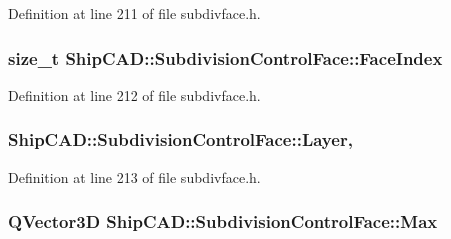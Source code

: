 Definition at line 211 of file subdivface.\-h.

\hypertarget{classShipCAD_1_1SubdivisionControlFace_a003c8c3987b10f6f2217a95ef97ba47d}{
\subsubsection[{Face\-Index}]{\setlength{\rightskip}{0pt plus 5cm}size\-\_\-t Ship\-C\-A\-D\-::\-Subdivision\-Control\-Face\-::\-Face\-Index\hspace{0.3cm}{\ttfamily [read]}}}\label{classShipCAD_1_1SubdivisionControlFace_a003c8c3987b10f6f2217a95ef97ba47d}


Definition at line 212 of file subdivface.\-h.

\hypertarget{classShipCAD_1_1SubdivisionControlFace_af4197bb400705aaea045fbe02921b3ea}{
\subsubsection[{Layer}]{ Ship\-C\-A\-D\-::\-Subdivision\-Control\-Face\-::\-Layer\hspace{0.3cm}{\ttfamily [read]}, {\ttfamily [write]}}}\label{classShipCAD_1_1SubdivisionControlFace_af4197bb400705aaea045fbe02921b3ea}


Definition at line 213 of file subdivface.\-h.

\hypertarget{classShipCAD_1_1SubdivisionControlFace_a256f4b52aa41d3140502ce70f98b1fe1}{
\subsubsection[{Max}]{\setlength{\rightskip}{0pt plus 5cm}Q\-Vector3\-D Ship\-C\-A\-D\-::\-Subdivision\-Control\-Face\-::\-Max\hspace{0.3cm}{\ttfamily [read]}}}\label{classShipCAD_1_1SubdivisionControlFace_a256f4b52aa41d3140502ce70f98b1fe1}


